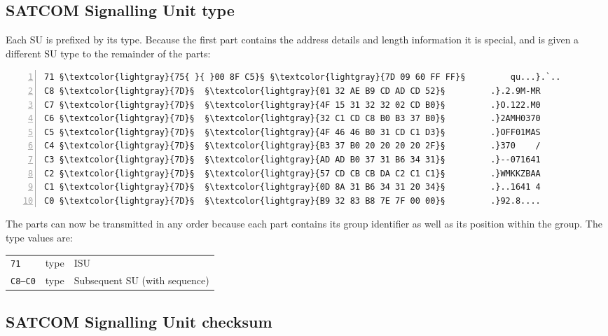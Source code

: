 \documentclass[tikz,a4paper,12pt]{article}
\begin{document}
\clearpage
\subsection{SATCOM Signalling Unit type}

Each \acrlong{SU} is prefixed by its type.  Because the first part
contains the address details and length information it is special, and is given a different \acrlong{SU} type
to the remainder of the parts:
\vfill
\begin{lstlisting}[language=SATCOM,numbers=left]
71 §\textcolor{lightgray}{75{ }{ }00 8F C5}§ §\textcolor{lightgray}{7D 09 60 FF FF}§         qu...}.`..
C8 §\textcolor{lightgray}{7D}§  §\textcolor{lightgray}{01 32 AE B9 CD AD CD 52}§         .}.2.9M-MR
C7 §\textcolor{lightgray}{7D}§  §\textcolor{lightgray}{4F 15 31 32 32 02 CD B0}§         .}O.122.M0
C6 §\textcolor{lightgray}{7D}§  §\textcolor{lightgray}{32 C1 CD C8 B0 B3 37 B0}§         .}2AMH0370
C5 §\textcolor{lightgray}{7D}§  §\textcolor{lightgray}{4F 46 46 B0 31 CD C1 D3}§         .}OFF01MAS
C4 §\textcolor{lightgray}{7D}§  §\textcolor{lightgray}{B3 37 B0 20 20 20 20 2F}§         .}370    /
C3 §\textcolor{lightgray}{7D}§  §\textcolor{lightgray}{AD AD B0 37 31 B6 34 31}§         .}--071641
C2 §\textcolor{lightgray}{7D}§  §\textcolor{lightgray}{57 CD CB CB DA C2 C1 C1}§         .}WMKKZBAA
C1 §\textcolor{lightgray}{7D}§  §\textcolor{lightgray}{0D 8A 31 B6 34 31 20 34}§         .}..1641 4
C0 §\textcolor{lightgray}{7D}§  §\textcolor{lightgray}{B9 32 83 B8 7E 7F 00 00}§         .}92.8....
\end{lstlisting}

The parts can now be transmitted in any order because each part contains its group identifier as well as 
its position within the group.  The type values are:

\begin{center}
\begin{tabular}{p{1.5cm}p{2cm}p{8cm}}
\hfill\texttt{71}&type&\acrlong{ISU}\\
\hfill\texttt{C8--C0}&type&Subsequent \acrlong{SU} (with sequence)\\
\end{tabular}
\end{center}

\subsection{SATCOM Signalling Unit checksum}
\end{document}

